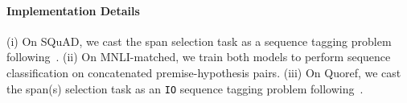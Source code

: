 \paragraph{Implementation Details}
(i) On SQuAD, we cast the span selection task as a sequence tagging problem following~\citet{segal-etal-2020-simple}. 
(ii) On MNLI-matched, we train both models to perform sequence classification on concatenated premise-hypothesis pairs.
(iii) On {Quoref}, we cast the span(s) selection task as an \texttt{IO} sequence tagging problem following~\citet{segal-etal-2020-simple}. 




